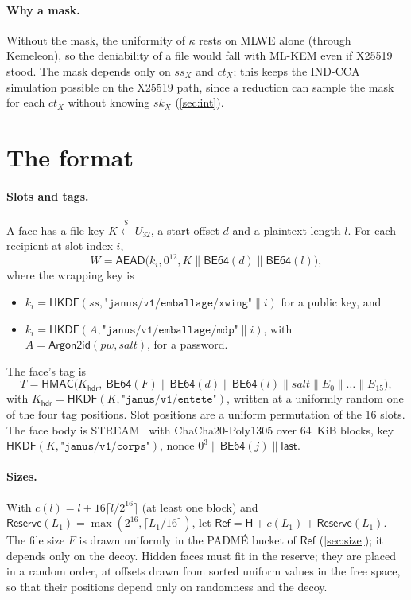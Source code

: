 \documentclass[11pt,a4paper]{article}
\theoremstyle{definition}
\theoremstyle{remark}
\newcommand{\Hdr}{\mathsf{H}}
\newcommand{\RefSz}{\mathsf{Ref}}
\newcommand{\Res}{\mathsf{Reserve}}
\newcommand{\HKDF}{\mathsf{HKDF}}
\newcommand{\HMAC}{\mathsf{HMAC}}
\newcommand{\AEAD}{\mathsf{AEAD}}
\newcommand{\Argon}{\mathsf{Argon2id}}
\newcommand{\str}[1]{\texttt{"#1"}}
\newcommand{\getsr}{\xleftarrow{\$}}
\begin{document}
\paragraph{Why a mask.} Without the mask, the uniformity of $\kappa$ rests on MLWE alone (through Kemeleon), so the deniability of a file would fall with ML-KEM even if X25519 stood. The mask depends only on $ss_X$ and $ct_X$; this keeps the IND-CCA simulation possible on the X25519 path, since a reduction can sample the mask for each $ct_X$ without knowing $sk_X$ (\cref{sec:int}).

\section{The format}
\label{sec:format}

\paragraph{Slots and tags.} A face has a file key $K\getsr U_{32}$, a start offset $d$ and a plaintext length $l$. For each recipient at slot index $i$,
\[ W = \AEAD\big(k_i, 0^{12}, K\|\mathsf{BE64}(d)\|\mathsf{BE64}(l)\big), \]
where the wrapping key is
\begin{itemize}
\item $k_i = \HKDF(ss, \str{janus/v1/emballage/xwing}\|i)$ for a public key, and
\item $k_i = \HKDF(A, \str{janus/v1/emballage/mdp}\|i)$, with $A = \Argon(\mathit{pw},\mathit{salt})$, for a password.
\end{itemize}
The face's tag is
\[
T = \HMAC\big(K_{\mathsf{hdr}},\ \mathsf{BE64}(F)\|\mathsf{BE64}(d)\|\mathsf{BE64}(l)\|\mathit{salt}\|E_0\|\dots\|E_{15}\big),
\]
with $K_{\mathsf{hdr}} = \HKDF(K,\str{janus/v1/entete})$,
written at a uniformly random one of the four tag positions. Slot positions are a uniform permutation of the 16 slots. The face body is STREAM~\cite{stream} with ChaCha20-Poly1305 over 64~KiB blocks, key $\HKDF(K,\str{janus/v1/corps})$, nonce $0^3\|\mathsf{BE64}(j)\|\mathsf{last}$.

\paragraph{Sizes.} With $c(l) = l + 16\lceil l/2^{16}\rceil$ (at least one block) and $\Res(L_1) = \max(2^{16}, \lceil L_1/16\rceil)$, let $\RefSz = \Hdr + c(L_1) + \Res(L_1)$. The file size $F$ is drawn uniformly in the PADM\'E bucket of $\RefSz$ (\cref{sec:size}); it depends only on the decoy. Hidden faces must fit in the reserve; they are placed in a random order, at offsets drawn from sorted uniform values in the free space, so that their positions depend only on randomness and the decoy.
\end{document}
